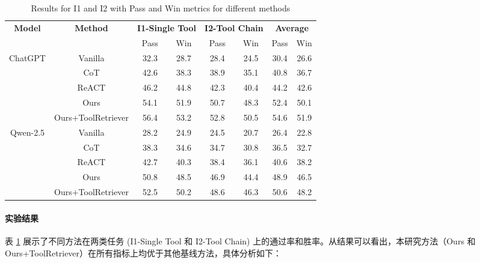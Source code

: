 \begin{table}[!ht]
  \centering
  \begin{tabular}{c|c|cc|cc|cc}
  \toprule
  \textbf{Model} & \textbf{Method} & \multicolumn{2}{c|}{\textbf{I1-Single Tool}} & \multicolumn{2}{c|}{\textbf{I2-Tool Chain}} & \multicolumn{2}{c}{\textbf{Average}} \\
  & & Pass & Win & Pass & Win & Pass & Win \\
  \midrule
  ChatGPT & Vanilla          & 32.3 & 28.7 & 28.4 & 24.5 & 30.4 & 26.6 \\
          & CoT              & 42.6 & 38.3 & 38.9 & 35.1 & 40.8 & 36.7 \\
          & ReACT            & 46.2 & 44.8 & 42.3 & 40.4 & 44.2 & 42.6 \\
          & Ours             & 54.1 & 51.9 & 50.7 & 48.3 & 52.4 & 50.1 \\
          & Ours+ToolRetriever & 56.4 & 53.2 & 52.8 & 50.5 & 54.6 & 51.9 \\
  \midrule
  Qwen-2.5 & Vanilla          & 28.2 & 24.9 & 24.5 & 20.7 & 26.4 & 22.8 \\
           & CoT              & 38.3 & 34.6 & 34.7 & 30.8 & 36.5 & 32.7 \\
           & ReACT            & 42.7 & 40.3 & 38.4 & 36.1 & 40.6 & 38.2 \\
           & Ours             & 50.8 & 48.5 & 46.9 & 44.4 & 48.9 & 46.5 \\
           & Ours+ToolRetriever & 52.5 & 50.2 & 48.6 & 46.3 & 50.6 & 48.2 \\
  \bottomrule
  \end{tabular}
  \caption{Results for I1 and I2 with Pass and Win metrics for different methods}
  \label{tab:simplified_pass_win}
\end{table}

\paragraph{实验结果}

表 \ref{tab:simplified_pass_win} 展示了不同方法在两类任务 (I1-Single Tool 和 I2-Tool Chain) 上的通过率和胜率。从结果可以看出，本研究方法（Ours 和 Ours+ToolRetriever）在所有指标上均优于其他基线方法，具体分析如下：

